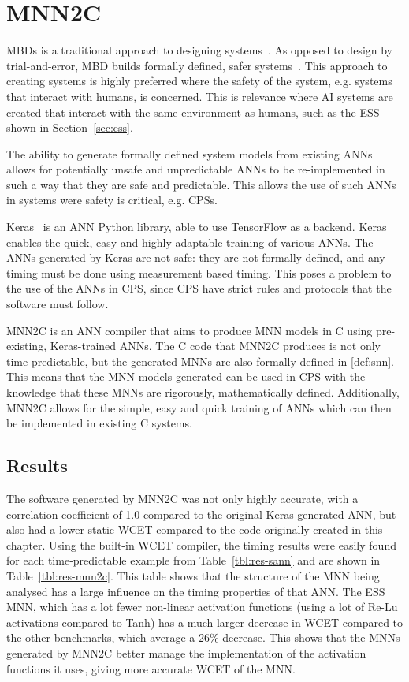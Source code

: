 \section{\acf{MNN2C}}
\label{sec:mnn2c}
\acfp{MBD} is a traditional approach to designing systems~\cite{dmd2019}.
As opposed to design by trial-and-error, \ac{MBD} builds formally defined, safer systems~\cite{dmd2019}.
This approach to creating systems is highly preferred where the safety of the system, e.g. systems that interact with humans, is concerned.
This is relevance where \ac{AI} systems are created that interact with the same environment as humans, such as the \acf{ESS} shown in Section~\ref{sec:ess}.

The ability to generate formally defined system models from existing \acp{ANN} allows for potentially unsafe and unpredictable \acp{ANN} to be re-implemented in such a way that they are safe and predictable.
This allows the use of such \acp{ANN} in systems were safety is critical, e.g. \acfp{CPS}.

Keras~\cite{chollet2015keras} is an \ac{ANN} Python library, able to use TensorFlow as a backend. 
Keras enables the quick, easy and highly adaptable training of various \acp{ANN}.
The \acp{ANN} generated by Keras are not safe: they are not formally defined, and any timing must be done using measurement based timing. 
This poses a problem to the use of the \acp{ANN} in \ac{CPS}, since \ac{CPS} have strict rules and protocols that the software must follow.

\acf{MNN2C} is an \ac{ANN} compiler that aims to produce \acf{MNN} models in C using pre-existing, Keras-trained \acp{ANN}.
The C code that \ac{MNN2C} produces is not only time-predictable, but the generated \acp{MNN} are also formally defined in \ref{def:snn}.
This means that the \ac{MNN} models generated can be used in \ac{CPS} with the knowledge that these \acp{MNN} are rigorously, mathematically defined. 
Additionally, \ac{MNN2C} allows for the simple, easy and quick training of \acp{ANN} which can then be implemented in existing C systems.

\subsection{Results}
The software generated by \ac{MNN2C} was not only highly accurate, with a correlation coefficient of 1.0 compared to the original Keras generated \ac{ANN}, but also had a lower static \ac{WCET} compared to the code originally created in this chapter.
Using the built-in \ac{WCET} compiler, the timing results were easily found for each time-predictable example from Table~\ref{tbl:res-sann} and are shown in Table~\ref{tbl:res-mnn2c}.
This table shows that the structure of the \ac{MNN} being analysed has a large influence on the timing properties of that \ac{ANN}. 
The \ac{ESS} \ac{MNN}, which has a lot fewer non-linear activation functions (using a lot of Re-Lu activations compared to Tanh) has a much larger decrease in \ac{WCET} compared to the other benchmarks, which average a 26\% decrease.
This shows that the \acp{MNN} generated by \ac{MNN2C} better manage the implementation of the activation functions it uses, giving more accurate \ac{WCET} of the \ac{MNN}.

